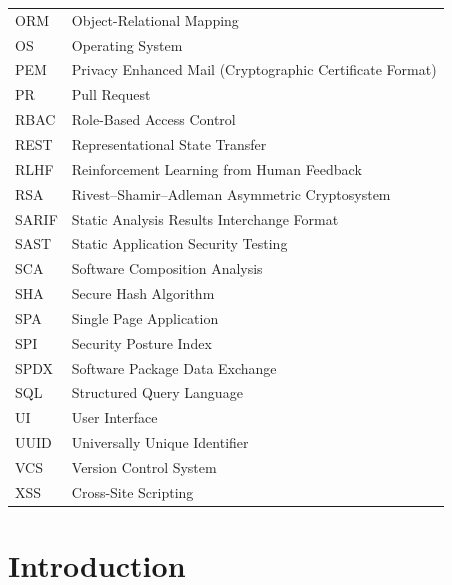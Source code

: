 \documentclass[12pt,a4paper,oneside]{report}
\begin{document}
\begin{longtable}{p{} p{}}
ORM & Object-Relational Mapping \\
OS & Operating System \\
PEM & Privacy Enhanced Mail (Cryptographic Certificate Format) \\
PR & Pull Request \\
RBAC & Role-Based Access Control \\
REST & Representational State Transfer \\
RLHF & Reinforcement Learning from Human Feedback \\
RSA & Rivest--Shamir--Adleman Asymmetric Cryptosystem \\
SARIF & Static Analysis Results Interchange Format \\
SAST & Static Application Security Testing \\
SCA & Software Composition Analysis \\
SHA & Secure Hash Algorithm \\
SPA & Single Page Application \\
SPI & Security Posture Index \\
SPDX & Software Package Data Exchange \\
SQL & Structured Query Language \\
UI & User Interface \\
UUID & Universally Unique Identifier \\
VCS & Version Control System \\
XSS & Cross-Site Scripting \\
\end{longtable}

\cleardoublepage

\tableofcontents
\cleardoublepage

\listoffigures
{}
\cleardoublepage

\listoftables
{}
\cleardoublepage

\cleardoublepage





\chapter{Introduction}
\label{chap:introduction}
\end{document}

